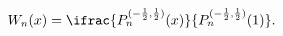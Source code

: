 \[\mathop{W_{n}\/}\nolimits\!\left(x\right)=\ifrac{\mathop{P^{(-\frac{1}{2},%
\frac{1}{2})}_{n}\/}\nolimits\!\left(x\right)}{\mathop{P^{(-\frac{1}{2},\frac{%
1}{2})}_{n}\/}\nolimits\!\left(1\right)}.\]